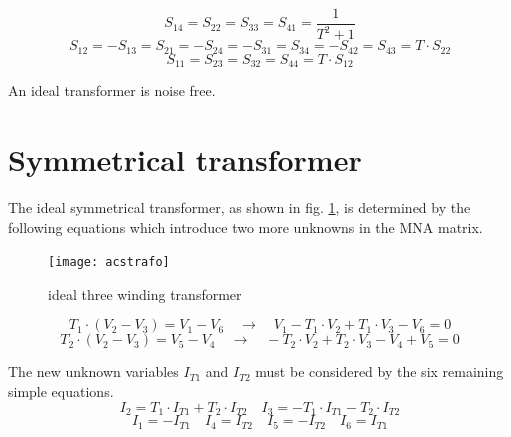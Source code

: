 \begin{equation}
S_{14} = S_{22} = S_{33} = S_{41} = \frac{1}{T^2+1}
\end{equation}
\begin{equation}
S_{12} = -S_{13} = S_{21} = -S_{24} = -S_{31} = S_{34} = -S_{42} = S_{43} = T\cdot S_{22}
\end{equation}
\begin{equation}
S_{11} = S_{23} = S_{32} = S_{44} = T\cdot S_{12}
\end{equation}

An ideal transformer is noise free.


\section{Symmetrical transformer}

The ideal symmetrical transformer, as shown in fig.
\ref{fig:strafo}, is determined by the following equations which
introduce two more unknowns in the MNA matrix.

\begin{figure}[ht]
\begin{center}
\texttt{[image: acstrafo]}
\end{center}
\caption{ideal three winding transformer}
\label{fig:strafo}
\end{figure}
\FloatBarrier

\begin{equation}
T_{1}\cdot\left(V_{2} - V_{3}\right) = V_{1} - V_{6}
\quad \rightarrow \quad
V_{1} - T_{1}\cdot V_{2} + T_{1}\cdot V_{3} - V_{6} = 0
\end{equation}
\begin{equation}
T_{2}\cdot\left(V_{2} - V_{3}\right) = V_{5} - V_{4}
\quad \rightarrow \quad
- T_{2}\cdot V_{2} + T_{2}\cdot V_{3} - V_{4} + V_{5} = 0
\label{eq:acstrafo}
\end{equation}

The new unknown variables $I_{T1}$ and $I_{T2}$ must be considered by
the six remaining simple equations.
\begin{equation}
I_{2} = T_{1}\cdot I_{T1} + T_{2}\cdot I_{T2} \quad I_{3} = -T_{1}\cdot I_{T1} - T_{2}\cdot I_{T2}
\end{equation}
\begin{equation}
I_{1} = -I_{T1} \quad I_{4} = I_{T2} \quad I_{5} = -I_{T2} \quad I_{6} = I_{T1}
\end{equation}

